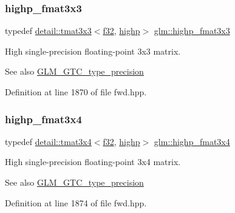 \subsubsection{\texorpdfstring{highp\+\_\+fmat3x3}{highp\_fmat3x3}}
{\footnotesize\ttfamily typedef \hyperlink{structglm_1_1detail_1_1tmat3x3}{detail\+::tmat3x3}$<$\hyperlink{group__gtc__type__precision_ga0ec999b57f5330d9021256e96038df04}{f32}, \hyperlink{namespaceglm_a0f04f086094c747d227af4425893f545ac6f7eab42eacbb10d59a58e95e362074}{highp}$>$ \hyperlink{group__gtc__type__precision_gaf1d697243b1de74a5769c49e68b1e2a6}{glm\+::highp\+\_\+fmat3x3}}

High single-\/precision floating-\/point 3x3 matrix. \begin{DoxySeeAlso}{See also}
\hyperlink{group__gtc__type__precision}{G\+L\+M\+\_\+\+G\+T\+C\+\_\+type\+\_\+precision} 
\end{DoxySeeAlso}


Definition at line 1870 of file fwd.\+hpp.

\mbox{\label{group__gtc__type__precision_ga1f377a3da21dd6c418ec3a5119a4514a}} 
\subsubsection{\texorpdfstring{highp\+\_\+fmat3x4}{highp\_fmat3x4}}
{\footnotesize\ttfamily typedef \hyperlink{structglm_1_1detail_1_1tmat3x4}{detail\+::tmat3x4}$<$\hyperlink{group__gtc__type__precision_ga0ec999b57f5330d9021256e96038df04}{f32}, \hyperlink{namespaceglm_a0f04f086094c747d227af4425893f545ac6f7eab42eacbb10d59a58e95e362074}{highp}$>$ \hyperlink{group__gtc__type__precision_ga1f377a3da21dd6c418ec3a5119a4514a}{glm\+::highp\+\_\+fmat3x4}}

High single-\/precision floating-\/point 3x4 matrix. \begin{DoxySeeAlso}{See also}
\hyperlink{group__gtc__type__precision}{G\+L\+M\+\_\+\+G\+T\+C\+\_\+type\+\_\+precision} 
\end{DoxySeeAlso}


Definition at line 1874 of file fwd.\+hpp.

\mbox{\label{group__gtc__type__precision_ga4c7c9823ade7c29e29b5a313949ae502}} 
